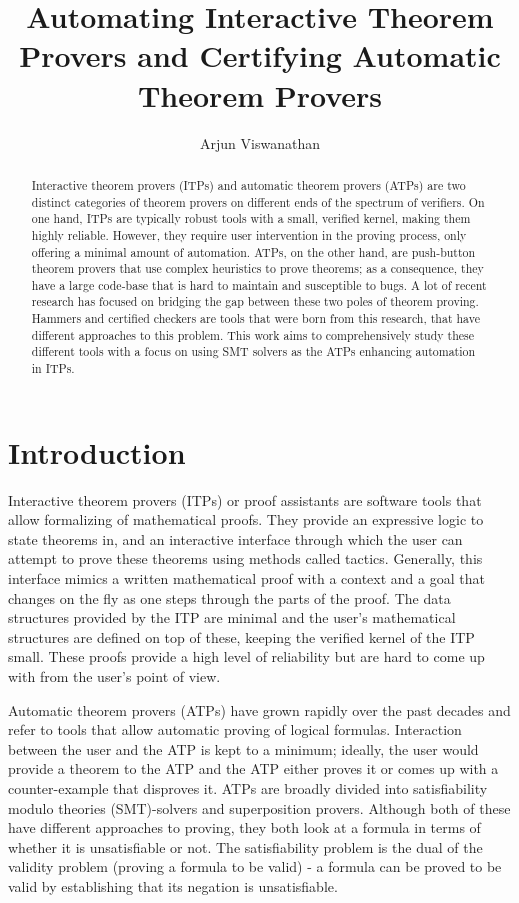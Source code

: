 \documentclass{article}
\begin{document}
\title{Automating Interactive Theorem Provers and Certifying Automatic Theorem Provers}
\author{Arjun Viswanathan}
\date{}
\maketitle
\begin{abstract}
	Interactive theorem provers (ITPs) and automatic theorem provers (ATPs)
	are two distinct categories of theorem provers on different ends 
	of the spectrum of verifiers. On one hand, 
	ITPs are typically robust tools with a small, verified kernel, 
	making them highly reliable. However, they 
	require user intervention in the proving process, only
	offering a minimal amount of automation. ATPs, on the other hand, 
	are push-button theorem provers that use complex heuristics to prove 
	theorems; as a consequence, they have a large code-base that is hard 
	to maintain and susceptible to bugs. A lot of recent research 
	has focused on bridging the gap between these two poles 
	of theorem proving. Hammers and certified checkers 
	are tools that were born from this research, that have different 
	approaches to this problem. This work aims to 
	comprehensively study these different tools 
	with a focus on using SMT solvers as
	the ATPs enhancing automation in ITPs.
\end{abstract}

\section{Introduction}
\label{sec:intro}
	Interactive theorem provers (ITPs) or proof assistants are 
	software tools that allow formalizing of mathematical proofs.
	They provide an expressive logic to state theorems in, and 
	an interactive interface through which the user can 
	attempt to prove these theorems using methods 
	called tactics. Generally, this interface mimics a 
	written mathematical proof with a context and a goal 
	that changes on the fly as one steps through the parts 
	of the proof. The data structures provided by the ITP are 
	minimal and the user's mathematical structures are 
	defined on top of these, keeping the verified kernel of the 
	ITP small. These proofs provide a high level of reliability
	but are hard to come up with from the user's point of view. 
	
	Automatic theorem provers (ATPs) have grown rapidly over the 
	past decades and refer to tools that allow automatic proving 
	of logical formulas. Interaction between the user and the 
	ATP is kept to a minimum; ideally, the user would provide a 
	theorem to the ATP and the ATP either proves it or comes up
	with a counter-example that disproves it. ATPs are broadly divided into satisfiability modulo theories 
	(SMT)-solvers and superposition provers. Although both 
	of these have different approaches to proving, they 
	both look at a formula in terms of whether it is 
	unsatisfiable or not. The satisfiability problem 
	is the dual of the validity problem (proving a 
	formula to be valid) - a formula can be proved to be 
	valid by establishing that its negation is 
	unsatisfiable.
	
\end{document}
